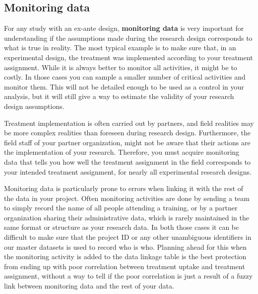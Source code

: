 \subsection{Monitoring data}

For any study with an ex-ante design,
\textbf{monitoring data}
is very important for understanding if the
assumptions made during the research design
corresponds to what is true in reality.
The most typical example is to make sure that,
in an experimental design,
the treatment was implemented according to your treatment assignment.
While it is always better to monitor all activities,
it might be to costly.
In those cases you can sample a smaller number of critical activities and monitor them.
This will not be detailed enough to be used as a control in your analysis,
but it will still give a way to
estimate the validity of your research design assumptions.

Treatment implementation is often carried out by partners,
and field realities may be more complex realities than foreseen during research design.
Furthermore, the field staff of your partner organization,
might not be aware that their actions are the implementation of your research.
Therefore, you must acquire monitoring data that
tells you how well the treatment assignment in the field
corresponds to your intended treatment assignment,
for nearly all experimental research designs.

Monitoring data is particularly prone to errors
when linking it with the rest of the data in your project.
Often monitoring activities are done by
sending a team to simply record the name of all people attending a training,
or by a partner organization sharing their administrative data,
which is rarely maintained in the same format or structure as your research data.
In both those cases it can be difficult to make sure that
the project ID or any other unambiguous identifiers in our master datasets
is used to record who is who.
Planning ahead for this when the monitoring activity is added to the data linkage table
is the best protection from ending up with poor correlation
between treatment uptake and treatment assignment,
without a way to tell if the poor correlation is just
a result of a fuzzy link between monitoring data and the rest of your data.


